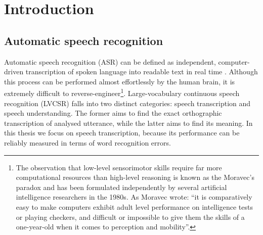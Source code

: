 \chapter{Introduction}
\label{chapter:intro}

\section{Automatic speech recognition}
\label{section:asr}
Automatic speech recognition (ASR)  can be defined as independent, computer-driven transcription of spoken language into readable text in real time \cite{stuckless1994developments, jelinek1997statistical}. Although this process can be performed almost effortlessly by the human brain, it is extremely difficult to reverse-engineer\footnote{The observation that low-level sensorimotor skills require far more computational resources than high-level reasoning is known as the Moravec's paradox and has been formulated independently by several artificial intelligence researchers in the 1980s. As Moravec wrote: ``it is comparatively easy to make computers exhibit adult level performance on intelligence tests or playing checkers, and difficult or impossible to give them the skills of a one-year-old when it comes to perception and mobility''\cite{moravec1988mind}.}. Large-vocabulary continuous speech recognition (LVCSR) falls into two distinct categories: speech transcription and speech understanding. The former aims to find the exact orthographic transcription of analysed utterance, while the latter aims to find its meaning. In this thesis we focus on speech transcription, because its performance can be reliably measured in terms of word recognition errors.

